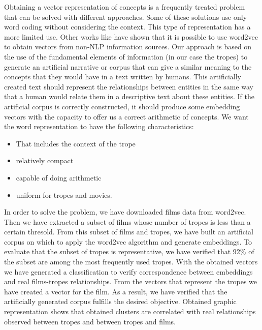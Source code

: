 \documentclass[letterpaper]{article}
\begin{document}
	Obtaining a vector representation of concepts is a frequently treated problem that can be solved with different approaches. Some of these solutions use only word coding without considering the context. This type of representation has a more limited use. Other works like \cite{kazama2018} have shown that it is
	possible to use word2vec to obtain vectors from non-NLP information
	sources. Our approach is based on the use of the fundamental elements
	of information (in our case the tropes) to generate an artificial
	narrative or corpus that can give a similar meaning to the concepts
	that they would have in a text written by humans. This artificially
	created text should represent the relationships between entities in
	the same way that a human would relate them in a descriptive text
	about these entities. If the artificial corpus is correctly
	constructed, it should produce some embedding vectors with the
	capacity to offer us a correct arithmetic of concepts. We want the word representation to have the following characteristics: 
	
	\begin{itemize}

	\item That includes the context of the trope
	\item relatively compact
	\item capable of doing arithmetic
	\item uniform for tropes and movies.
		
    \end{itemize}
	   
	   

    In order to solve the problem, we have downloaded films data from word2vec. Then we have extracted a subset of films whose number of tropes is less than a certain thresold. From this subset of films and tropes, we have built an artificial corpus on which to apply the word2vec algorithm and generate embeddings. To evaluate that the subset of tropes is representative, we have verified that 92\% of the subset are among the most frequently used tropes. With the obtained vectors we have generated a classification to verify correspondence between embeddings and real films-tropes relationships. From the vectors that represent the tropes we have created a vector for the film. As a result, we have verified that the artificially generated corpus fulfills the desired objective. Obtained graphic representation shows that obtained clusters are correlated with real relationships observed between tropes and between tropes and films.\\
 
\end{document}
